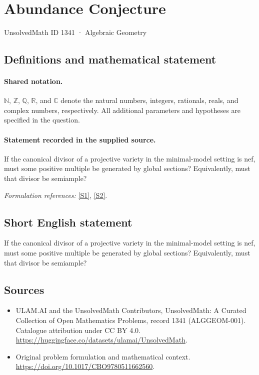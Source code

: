 \documentclass[11pt]{article}
\newcommand{\sref}[2]{\hyperlink{source:#1:#2}{[S#2]}}
\begin{document}
\setcounter{section}{1340}
\section{Abundance Conjecture}\label{1341}
{\small UnsolvedMath ID 1341 · Algebraic Geometry}
\subsection{Definitions and mathematical statement}

\paragraph{Shared notation.}$\mathbb N$, $\mathbb Z$, $\mathbb Q$, $\mathbb R$, and $\mathbb C$ denote the natural numbers, integers, rationals, reals, and complex numbers, respectively. All additional parameters and hypotheses are specified in the question.


\paragraph{Statement recorded in the supplied source.}
If the canonical divisor of a projective variety in the minimal-model setting is nef, must some positive multiple be generated by global sections? Equivalently, must that divisor be semiample?
\par\smallskip\textit{Formulation references:} \sref{1341}{1}, \sref{1341}{2}.
\subsection{Short English statement}
If the canonical divisor of a projective variety in the minimal-model setting is nef, must some positive multiple be generated by global sections? Equivalently, must that divisor be semiample?
\subsection{Sources}
\begin{itemize}
\item[\hypertarget{source:1341:1}{S1}] ULAM.AI and the UnsolvedMath Contributors, UnsolvedMath: A Curated Collection of Open Mathematics Problems, record 1341 (ALGGEOM-001). Catalogue attribution under CC BY 4.0.
\url{https://huggingface.co/datasets/ulamai/UnsolvedMath}.
\item[\hypertarget{source:1341:2}{S2}] Original problem formulation and mathematical context.
\url{https://doi.org/10.1017/CBO9780511662560}.
\end{itemize}
\label{end:1341}
\end{document}

